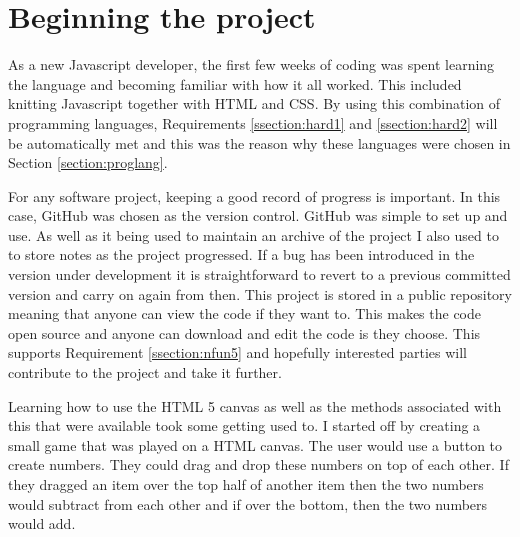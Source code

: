 \section{Beginning the project}

As a new Javascript developer, the first few weeks of coding was spent learning the language and becoming familiar with how it all worked. This included knitting Javascript together with HTML and CSS. By using this combination of programming languages, Requirements \ref{ssection:hard1} and \ref{ssection:hard2} will be automatically met and this was the reason why these languages were chosen in Section \ref{section:proglang}.

For any software project, keeping a good record of progress is important. In this case, GitHub was chosen as the version control. GitHub was simple to set up and use. As well as it being used to  maintain an archive of the project I also used to to store notes as the project progressed. If a bug has been introduced in the version under development it is straightforward to revert to a previous committed version and carry on again from then. This project is stored in a public repository meaning that anyone can view the code if they want to. This makes the code open source and anyone can download and edit the code is they choose. This supports Requirement \ref{ssection:nfun5} and hopefully interested parties will contribute to the project and take it further.

Learning how to use the HTML 5 canvas as well as the methods associated with this that were available took some getting used to. I started off by creating a small game that was played on a HTML canvas. The user would use a button to create numbers. They could drag and drop these numbers on top of each other. If they dragged an item over the top half of another item then the two numbers would subtract from each other and if over the bottom, then the two numbers would add.

